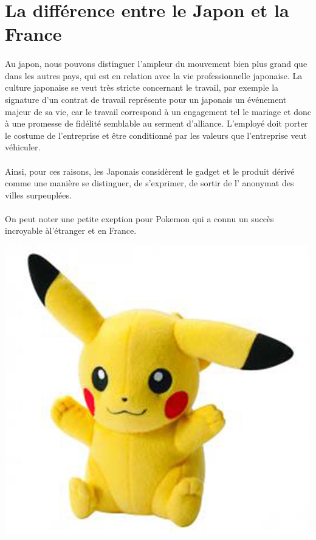 \section{La différence entre le Japon et la France}
\paragraph{}
Au japon, nous pouvons distinguer l’ampleur du mouvement bien plus grand que dans les autres pays, qui est en relation avec la vie professionnelle japonaise. La culture japonaise se veut très stricte concernant le travail, par exemple la signature d’un contrat de travail représente pour un japonais un événement majeur de sa vie, car le travail correspond à un engagement tel le mariage et donc à une promesse de fidélité semblable au serment d’alliance. L’employé doit porter le costume de l’entreprise et être conditionné par les valeurs que l’entreprise veut véhiculer. 
\paragraph{}
Ainsi, pour ces raisons, les Japonais considèrent le gadget et le produit dérivé comme une manière se distinguer, de s’exprimer, de sortir de l’ anonymat des villes surpeuplées. 
\paragraph{}
On peut noter une petite exeption pour Pokemon qui a connu un succès incroyable àl’étranger et en France.
\begin{center}
	\includegraphics[scale=0.15]{pokemon.jpg}
\end{center}

